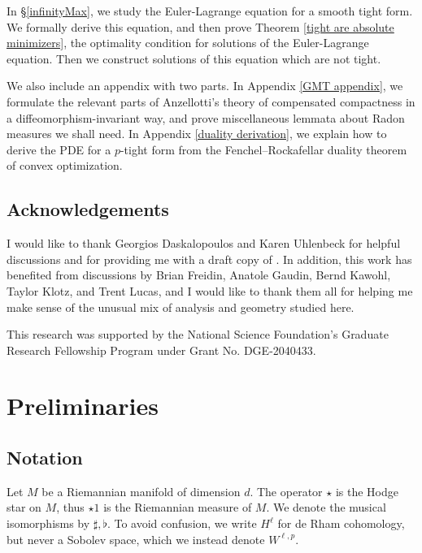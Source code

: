 \documentclass[reqno,11pt]{amsart}
\newcommand{\loc}{\mathrm{loc}}
\newcommand{\cpt}{\mathrm{cpt}}
\theoremstyle{definition}
\numberwithin{equation}{section}
\begin{document}
In \S\ref{infinityMax}, we study the Euler-Lagrange equation for a smooth tight form.
We formally derive this equation, and then prove Theorem \ref{tight are absolute minimizers}, the optimality condition for solutions of the Euler-Lagrange equation.
Then we construct solutions of this equation which are not tight.

We also include an appendix with two parts.
In Appendix \ref{GMT appendix}, we formulate the relevant parts of Anzellotti's theory of compensated compactness in a diffeomorphism-invariant way, and prove miscellaneous lemmata about Radon measures we shall need.
In Appendix \ref{duality derivation}, we explain how to derive the PDE for a $p$-tight form from the Fenchel--Rockafellar duality theorem of convex optimization.

\subsection{Acknowledgements}
I would like to thank Georgios Daskalopoulos and Karen Uhlenbeck for helpful discussions and for providing me with a draft copy of \cite{daskalopoulos2023}.
In addition, this work has benefited from discussions by Brian Freidin, Anatole Gaudin, Bernd Kawohl, Taylor Klotz, and Trent Lucas, and I would like to thank them all for helping me make sense of the unusual mix of analysis and geometry studied here.

This research was supported by the National Science Foundation's Graduate Research Fellowship Program under Grant No. DGE-2040433.

\section{Preliminaries}\label{prelims}
\subsection{Notation}
Let $M$ be a Riemannian manifold of dimension $d$.
The operator $\star$ is the Hodge star on $M$, thus $\star 1$ is the Riemannian measure of $M$.
We denote the musical isomorphisms by $\sharp, \flat$.
To avoid confusion, we write $H^\ell$ for de Rham cohomology, but never a Sobolev space, which we instead denote $W^{\ell, p}$.

\end{document}
